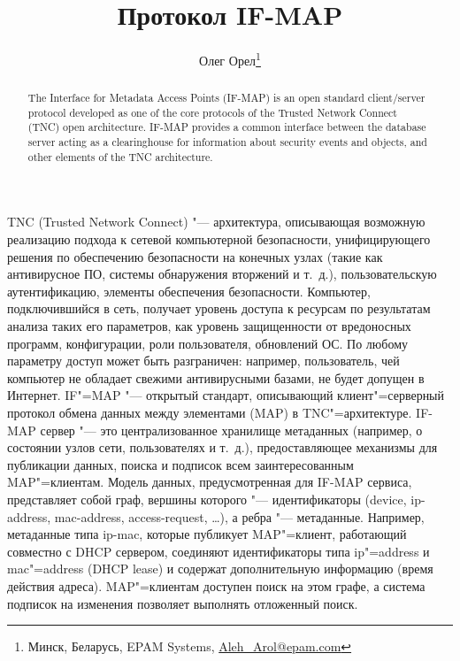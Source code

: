 \documentclass[10pt, a5paper]{article}
\begin{document}
\title{Протокол IF-MAP}
\author{Олег Орел\footnote{Минск, Беларусь, EPAM Systems, \url{Aleh_Arol@epam.com}}}
\date{}
\maketitle
\begin{abstract}
The Interface for Metadata Access Points (IF-MAP) is an open standard client/server protocol developed as one of the core protocols of the Trusted Network Connect (TNC) open architec\-ture. IF-MAP provides a common interface between the database server acting as a clearinghouse for information about security events and objects, and other elements of the TNC architecture.
\end{abstract}

TNC (Trusted Network Connect) "--- архитектура, описывающая возможную реализацию подхода к сетевой компьютерной безопасности, унифицирующего решения по обеспечению безопасности на конечных узлах (такие как антивирусное ПО, системы обнаружения вторжений и т.~д.), пользовательскую аутентификацию, элементы обеспечения безопасности. Компьютер, подключившийся в сеть, получает уровень доступа к ресурсам по результатам анализа таких его параметров, как уровень защищенности от вредоносных программ, конфигурации, роли пользователя, обновлений ОС. По любому параметру доступ может быть разграничен: например, пользователь, чей компьютер не обладает свежими антивирусными базами, не будет допущен в Интернет. IF"=MAP "--- открытый стандарт, описывающий клиент"=серверный протокол обмена данных между элементами (MAP) в TNC"=архитектуре.
IF-MAP сервер "--- это централизованное хранилище метаданных (например, о состоянии узлов сети, пользователях и т.~д.), предоставляющее механизмы для публикации данных, поиска и подписок всем заинтересованным MAP"=клиентам. Модель данных, предусмотренная для IF-MAP сервиса, представляет собой граф, вершины которого "--- идентификаторы (device, ip-address, mac-address, access-request, \ldots), а ребра "--- метаданные. Например, метаданные типа ip-mac, которые публикует MAP"=клиент, работающий совместно с DHCP сервером, соединяют идентификаторы типа ip"=address и mac"=address (DHCP lease) и содержат дополнительную информацию (время действия адреса). MAP"=клиентам доступен поиск на этом графе, а система подписок на изменения позволяет выполнять отложенный поиск.
\end{document}
